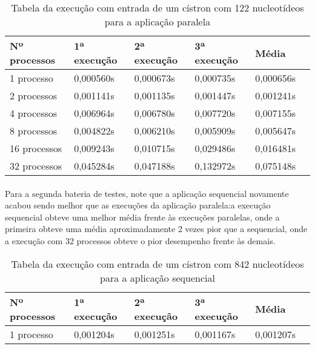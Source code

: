 \documentclass[a4paper,10pt]{article}
\begin{document}
\begin{table}[!htb]
\begin{tabular}{| l | l | l | l | l | p{5cm} |} 
\hline
Nº processos & 1ª execução & 2ª execução & 3ª execução & Média\\ \hline
1  processo & 0,000560s  &  0,000673s  &  0,000735s  &  0,000656s  \\ \hline
2 processos & 0,001141s  &  0,001135s  &  0,001447s  & 0,001241s  \\ \hline
4 processos & 0,006964s  &  0,006780s  &  0,007720s  &  0,007155s  \\ \hline
8 processos & 0,004822s  &  0,006210s  &  0,005909s  &  0,005647s  \\ \hline
16 processos & 0,009243s &  0,010715s  &  0,029486s  &  0,016481s    \\ \hline
32 processos & 0,045284s  &  0,047188s  &  0,132972s  &  0,075148s  \\ \hline
\end{tabular}
\caption{Tabela da execução com entrada de um cístron com 122 nucleotídeos para a aplicação paralela}
\end{table}

\paragraph{}Para a segunda bateria de testes, note que a aplicação sequencial novamente acabou sendo melhor que as execuções da aplicação paralela:a execução sequencial obteve uma melhor média frente às execuções paralelas, onde a primeira obteve uma média aproximadamente 2 vezes pior que a sequencial, onde a execução com 32 processos obteve o pior desempenho frente às demais.\\

\begin{table}[!htb]
\begin{tabular}{| l | l | l | l | l | p{5cm} |} 
\hline
  Nº processos & 1ª execução & 2ª execução & 3ª execução & Média\\ \hline
 1  processo & 0,001204s  &  0,001251s  &  0,001167s  &  0,001207s \\ \hline
\end{tabular}
\caption{Tabela da execução com entrada de um cístron com 842 nucleotídeos para a aplicação sequencial}
\end{table}
\end{document}
